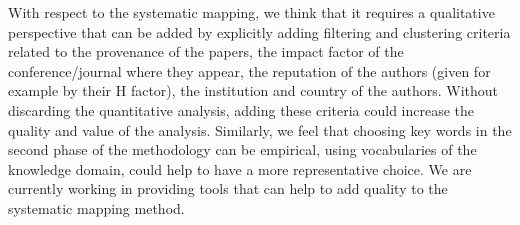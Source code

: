 
With respect to the systematic mapping, we think that it requires a qualitative perspective that can be added by explicitly adding filtering and clustering criteria related to the provenance of the papers, the impact factor of the conference/journal where they appear, the reputation of the authors (given for example by their H factor), the institution and country of the authors. Without discarding the quantitative analysis, adding these criteria could increase the quality and value of the analysis. Similarly, we feel that choosing key words in the second phase of the methodology can be empirical, using vocabularies of the knowledge domain, could help to have a more representative choice. We are currently working in providing tools that can help to add quality to the systematic mapping method.
